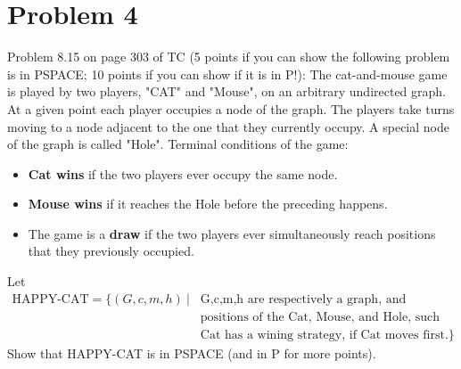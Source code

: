 \documentclass[twoside,11pt]{homework}
\date{\today} %
\begin{document}
\maketitle

\section*{Problem 4}

\begin{prob}
  Problem 8.15 on page 303 of TC (5 points if you can show the following problem
  is in PSPACE; 10 points if you can show if it is in P!):
  The cat-and-mouse game is played by two players, "CAT" and "Mouse", on an
  arbitrary undirected graph.
  At a given point each player occupies a node of the graph.
  The players take turns moving to a node adjacent to the one that they
  currently occupy.
  A special node of the graph is called "Hole".
  Terminal conditions of the game:
  \begin{itemize}
  \item \textbf{Cat wins} if the two players ever occupy the same node.
  \item \textbf{Mouse wins} if it reaches the Hole before the preceding happens.
  \item The game is a \textbf{draw} if the two players ever simultaneously reach
    positions that they previously occupied.
  \end{itemize} 
  Let
  \[
    \begin{aligned}
      \text{HAPPY-CAT} = \{ (G,c,m,h) \ | \
      &\text{G,c,m,h are respectively a graph, and}\\
      &\text{positions of the Cat, Mouse, and Hole, such that}\\
      &\text{Cat has a wining strategy, if Cat moves first}.\}
    \end{aligned}
  \]
  Show that HAPPY-CAT is in PSPACE (and in P for more points).
\end{prob}
\end{document}
